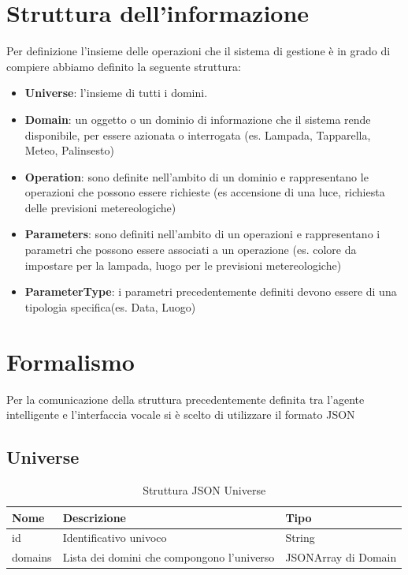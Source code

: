 \documentclass[twoside]{supsistudent}
\begin{document}
\section{Struttura dell'informazione}
Per definizione l'insieme delle operazioni che il sistema di gestione è in grado di compiere abbiamo definito la seguente struttura:
\begin{itemize}
	\item \textbf{Universe}: l'insieme di tutti i domini.
	\item \textbf{Domain}: un oggetto o un dominio di informazione che il sistema rende disponibile, per essere azionata o interrogata (es. Lampada, Tapparella, Meteo, Palinsesto)
	\item \textbf{Operation}: sono definite nell'ambito di un dominio e rappresentano le operazioni che possono essere richieste (es accensione di una luce, richiesta delle previsioni metereologiche)
	\item \textbf{Parameters}: sono definiti nell'ambito di un operazioni e rappresentano i parametri che possono essere associati a un operazione (es. colore da impostare per la lampada, luogo per le previsioni metereologiche)
	\item \textbf{ParameterType}: i parametri precedentemente definiti devono essere di una tipologia specifica(es. Data, Luogo)
\end{itemize}

\section{Formalismo}
Per la comunicazione della struttura precedentemente definita tra l'agente intelligente e l'interfaccia vocale si è scelto di utilizzare il formato JSON

\subsection{Universe}
\begin{table}[H]
\centering
\caption{Struttura JSON Universe}
\label{Struttura JSON Universe}
\begin{tabular}{@{}|l|l|l|@{}}
\toprule
Nome    & Descrizione                                & Tipo                \\ \midrule
id      & Identificativo univoco                     & String             \\ \midrule
domains & Lista dei domini che compongono l'universo & JSONArray di Domain \\ \bottomrule
\end{tabular}
\end{table}
\end{document}
